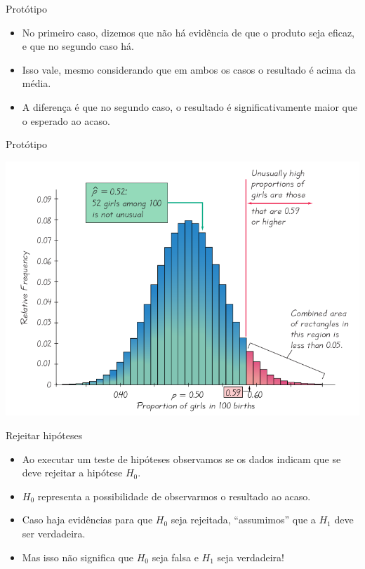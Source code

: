 \documentclass{beamer}
\begin{document}
\begin{frame}{Protótipo}
  \begin{itemize}
  \item No primeiro caso, dizemos que não há evidência de que o
    produto seja eficaz, e que no segundo caso há.
  \item Isso vale, mesmo considerando que em ambos os casos o
    resultado é acima da média.
  \item A diferença é que no segundo caso, o resultado é
    \alert{significativamente} maior que o esperado ao acaso.
  \end{itemize}
\end{frame}

\begin{frame}{Protótipo}
  \begin{center}
    \includegraphics[width=\textwidth]{TH_I/regiao_critica1}
  \end{center}
\end{frame}

\begin{frame}{Rejeitar hipóteses}
  \begin{itemize}
  \item Ao executar um teste de hipóteses observamos se os dados
    indicam que se deve rejeitar a hipótese $H_0$.
  \item $H_0$ representa a possibilidade de observarmos o resultado ao
    acaso.
  \item Caso haja evidências para que $H_0$ seja rejeitada,
    ``assumimos'' que a $H_1$ deve ser verdadeira.
  \item Mas isso não significa que $H_0$ seja falsa e $H_1$ seja verdadeira!
  \end{itemize}
\end{frame}
\end{document}
